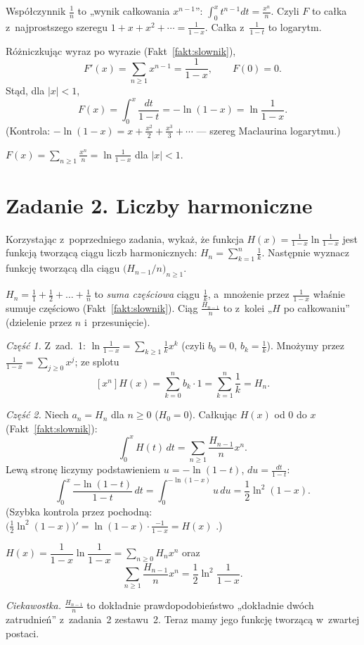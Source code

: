 \documentclass[11pt]{article}
\begin{document}
\begin{intuicja}
Współczynnik $\frac1n$ to „wynik całkowania $x^{n-1}$”:
$\int_0^xt^{n-1}dt=\frac{x^n}{n}$. Czyli $F$ to całka z~najprostszego szeregu
$1+x+x^2+\cdots=\frac1{1-x}$. Całka z~$\frac1{1-t}$ to logarytm.
\end{intuicja}

\formalnie
Różniczkując wyraz po wyrazie (Fakt~\ref{fakt:slownik}),
\[
F'(x)=\sum_{n\ge1}x^{n-1}=\frac1{1-x},\qquad F(0)=0.
\]
Stąd, dla $|x|<1$,
\[
F(x)=\int_0^x\frac{dt}{1-t}=-\ln(1-x)=\ln\frac1{1-x}.
\]
(Kontrola: $-\ln(1-x)=x+\frac{x^2}2+\frac{x^3}3+\cdots$ --- szereg Maclaurina
logarytmu.)
\begin{odpowiedz}
$F(x)=\displaystyle\sum_{n\ge1}\frac{x^n}{n}=\ln\frac1{1-x}$ \quad dla $|x|<1$.
\end{odpowiedz}

\section{Zadanie 2. Liczby harmoniczne}
\begin{tresc}
Korzystając z~poprzedniego zadania, wykaż, że funkcja
$H(x)=\frac1{1-x}\ln\frac1{1-x}$ jest funkcją tworzącą ciągu liczb
harmonicznych: $H_n=\sum_{k=1}^n\frac1k$. Następnie wyznacz funkcję
tworzącą dla ciągu $\bigl(H_{n-1}/n\bigr)_{n\ge1}$.
\end{tresc}

\begin{intuicja}
$H_n=\frac11+\frac12+\dots+\frac1n$ to \emph{suma częściowa} ciągu $\frac1k$,
a~mnożenie przez $\frac1{1-x}$ właśnie sumuje częściowo
(Fakt~\ref{fakt:slownik}). Ciąg $\frac{H_{n-1}}n$ to z~kolei „$H$ po
całkowaniu” (dzielenie przez $n$ i~przesunięcie).
\end{intuicja}

\formalnie
\emph{Część 1.} Z~zad.~1: $\ln\frac1{1-x}=\sum_{k\ge1}\frac1kx^k$ (czyli
$b_0=0$, $b_k=\frac1k$). Mnożymy przez $\frac1{1-x}=\sum_{j\ge0}x^j$; ze splotu
\[
[x^n]H(x)=\sum_{k=0}^nb_k\cdot1=\sum_{k=1}^n\frac1k=H_n.
\]

\emph{Część 2.} Niech $a_n=H_n$ dla $n\ge0$ ($H_0=0$). Całkując $H(x)$ od $0$
do $x$ (Fakt~\ref{fakt:slownik}):
\[
\int_0^xH(t)\,dt=\sum_{n\ge1}\frac{H_{n-1}}{n}x^n.
\]
Lewą stronę liczymy podstawieniem $u=-\ln(1-t)$, $du=\frac{dt}{1-t}$:
\[
\int_0^x\frac{-\ln(1-t)}{1-t}\,dt=\int_0^{-\ln(1-x)}u\,du=\frac12\ln^2(1-x).
\]
(Szybka kontrola przez pochodną: $\bigl(\frac12\ln^2(1-x)\bigr)'=
\ln(1-x)\cdot\frac{-1}{1-x}=H(x)$ \checkmark.)
\begin{odpowiedz}
$H(x)=\dfrac1{1-x}\ln\dfrac1{1-x}=\sum_{n\ge0}H_nx^n$ oraz
\[
\sum_{n\ge1}\frac{H_{n-1}}{n}x^n=\frac12\ln^2\frac1{1-x}.
\]
\end{odpowiedz}
\emph{Ciekawostka.} $\frac{H_{n-1}}n$ to dokładnie prawdopodobieństwo
„dokładnie dwóch zatrudnień” z~zadania~2 zestawu~2. Teraz mamy jego funkcję
tworzącą w~zwartej postaci.
\end{document}
